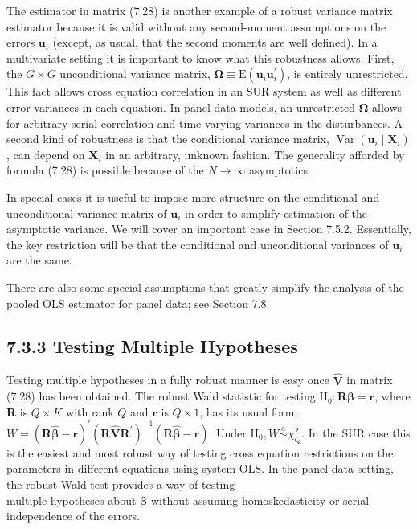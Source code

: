 \documentclass[10pt]{article}
\begin{document}
The estimator in matrix (7.28) is another example of a robust variance matrix estimator because it is valid without any second-moment assumptions on the errors $\mathbf{u}_{i}$ (except, as usual, that the second moments are well defined). In a multivariate setting it is important to know what this robustness allows. First, the $G \times G$ unconditional variance matrix, $\boldsymbol{\Omega} \equiv \mathrm{E}\left(\mathbf{u}_{i} \mathbf{u}_{i}^{\prime}\right)$, is entirely unrestricted. This fact allows cross equation correlation in an SUR system as well as different error variances in each equation. In panel data models, an unrestricted $\boldsymbol{\Omega}$ allows for arbitrary serial correlation and time-varying variances in the disturbances. A second kind of robustness is that the conditional variance matrix, $\operatorname{Var}\left(\mathbf{u}_{i} \mid \mathbf{X}_{i}\right)$, can depend on $\mathbf{X}_{i}$ in an arbitrary, unknown fashion. The generality afforded by formula (7.28) is possible because of the $N \rightarrow \infty$ asymptotics.

In special cases it is useful to impose more structure on the conditional and unconditional variance matrix of $\mathbf{u}_{i}$ in order to simplify estimation of the asymptotic variance. We will cover an important case in Section 7.5.2. Essentially, the key restriction will be that the conditional and unconditional variances of $\mathbf{u}_{i}$ are the same.

There are also some special assumptions that greatly simplify the analysis of the pooled OLS estimator for panel data; see Section 7.8.

\subsection*{7.3.3 Testing Multiple Hypotheses}
Testing multiple hypotheses in a fully robust manner is easy once $\hat{\mathbf{V}}$ in matrix (7.28) has been obtained. The robust Wald statistic for testing $\mathrm{H}_{0}: \mathbf{R} \boldsymbol{\beta}=\mathbf{r}$, where $\mathbf{R}$ is $Q \times K$ with rank $Q$ and $\mathbf{r}$ is $Q \times 1$, has its usual form, $W=(\mathbf{R} \hat{\boldsymbol{\beta}}-\mathbf{r})^{\prime}\left(\mathbf{R} \hat{\mathbf{V}} \mathbf{R}^{\prime}\right)^{-1}(\mathbf{R} \hat{\boldsymbol{\beta}}-\mathbf{r})$. Under $\mathrm{H}_{0}, W \stackrel{a}{\sim} \chi_{Q}^{2}$. In the SUR case this is the easiest and most robust way of testing cross equation restrictions on the parameters in different equations using system OLS. In the panel data setting, the robust Wald test provides a way of testing\\
multiple hypotheses about $\boldsymbol{\beta}$ without assuming homoskedasticity or serial independence of the errors.
\end{document}
